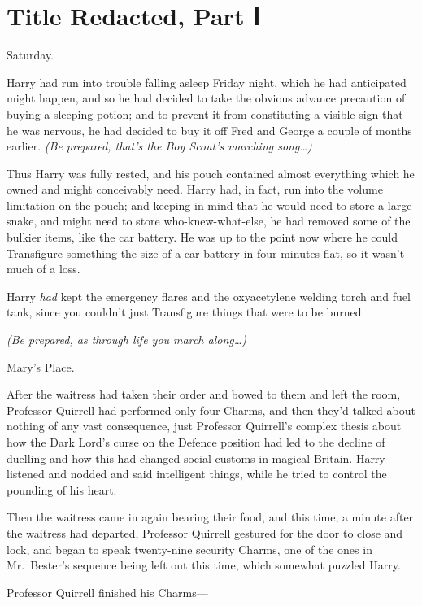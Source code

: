 \chapter{Title Redacted, Part Ⅰ}\label{title-redacted-part}

Saturday.

Harry had run into trouble falling asleep Friday night, which he had
anticipated might happen, and so he had decided to take the obvious
advance precaution of buying a sleeping potion; and to prevent it from
constituting a visible sign that he was nervous, he had decided to buy
it off Fred and George a couple of months earlier. \emph{(Be prepared,
that's the Boy Scout's marching song\ldots{})}

Thus Harry was fully rested, and his pouch contained almost everything
which he owned and might conceivably need. Harry had, in fact, run into
the volume limitation on the pouch; and keeping in mind that he would
need to store a large snake, and might need to store who-knew-what-else,
he had removed some of the bulkier items, like the car battery. He was
up to the point now where he could Transfigure something the size of a
car battery in four minutes flat, so it wasn't much of a loss.

Harry \emph{had} kept the emergency flares and the oxyacetylene welding
torch and fuel tank, since you couldn't just Transfigure things that
were to be burned.

\emph{(Be prepared, as through life you march along\ldots{})}

Mary's Place.

After the waitress had taken their order and bowed to them and left the
room, Professor Quirrell had performed only four Charms, and then they'd
talked about nothing of any vast consequence, just Professor Quirrell's
complex thesis about how the Dark Lord's curse on the Defence position
had led to the decline of duelling and how this had changed social
customs in magical Britain. Harry listened and nodded and said
intelligent things, while he tried to control the pounding of his heart.

Then the waitress came in again bearing their food, and this time, a
minute after the waitress had departed, Professor Quirrell gestured for
the door to close and lock, and began to speak twenty-nine security
Charms, one of the ones in Mr.~Bester's sequence being left out this
time, which somewhat puzzled Harry.

Professor Quirrell finished his Charms---

